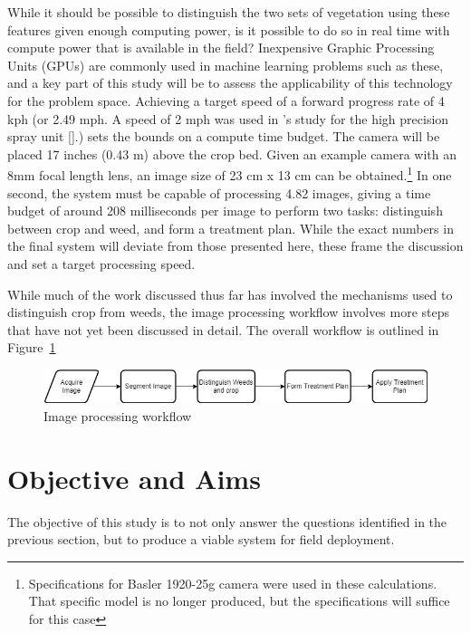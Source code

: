 \documentclass[12pt]{article}
\begin{document}
While it should be possible to distinguish the two sets of vegetation using these features given enough computing power, is it possible to do so in real time with compute power that is available in the field? Inexpensive Graphic Processing Units (GPUs) are commonly used in machine learning problems such as these, and a key part of this study will be to assess the applicability of this technology for the problem space. Achieving a target speed of a forward progress rate of 4 kph (or 2.49 mph.  A speed of 2 mph was used in \citeauthor{Siemens2020-ds}'s study for the high precision spray unit [\cite{Siemens2020-ds}].) sets the bounds on a compute time budget. The camera will be placed 17 inches (0.43 m) above the crop bed. Given an example camera with an 8mm focal length lens, an image size of 23 cm x 13 cm can be obtained.\footnote{Specifications for Basler 1920-25g camera were used in these calculations. That specific model is no longer produced, but the specifications will suffice for this case} In one second, the system must be capable of processing 4.82 images, giving a time budget of around 208 milliseconds per image to perform two tasks: distinguish between crop and weed, and form a treatment plan. While the exact numbers in the final system will deviate from those presented here, these frame the discussion and set a target processing speed.

While much of the work discussed thus far has involved the mechanisms used to distinguish crop from weeds, the image processing workflow involves more steps that have not yet been discussed in detail. The overall workflow is outlined in Figure~\ref{fig:image-processing-workflow}
\begin{figure}[H]
	\centering
	\includegraphics[width=0.75\linewidth]{./figures/image-processing-workflow.jpg}
	\caption{Image processing workflow}
	\label{fig:image-processing-workflow}
\end{figure}


 
\section{Objective and Aims}
The objective of this study is to not only answer the questions identified in the previous section, but to produce a viable system for field deployment. 
\end{document}
